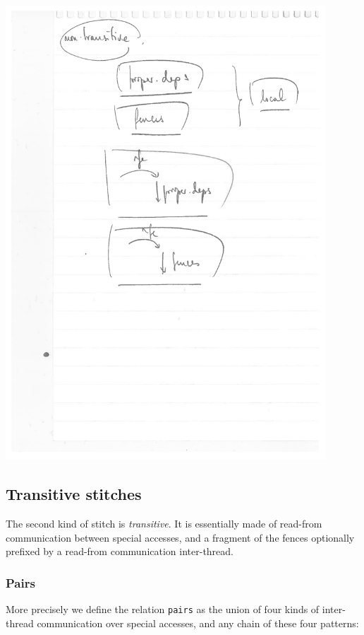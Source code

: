 \documentclass[a4paper]{article}
\begin{document}
\includegraphics[width=12cm]{non-trans-stitch}

\pagebreak

\subsection{Transitive stitches}

The second kind of stitch is \emph{transitive}. It is essentially made of
read-from communication between special accesses, and a fragment of the fences
optionally prefixed by a read-from communication inter-thread.

\subsubsection{Pairs}

More precisely we define the relation {\tt pairs} as the union of four kinds of
inter-thread communication over special accesses, and any chain of these four
patterns:
\end{document}
